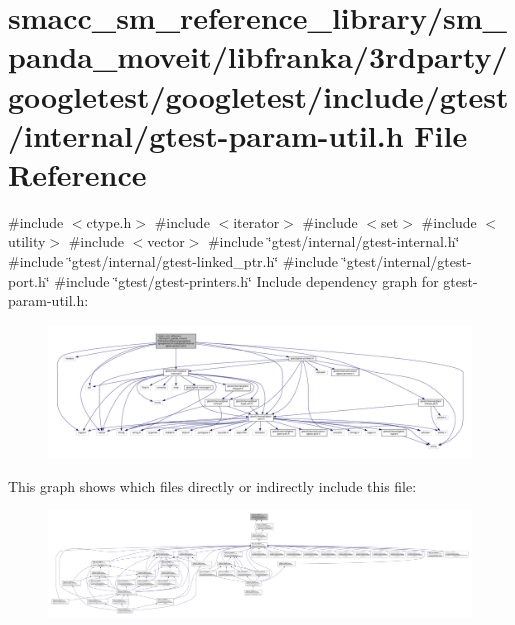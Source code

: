 \hypertarget{gtest-param-util_8h}{}\section{smacc\+\_\+sm\+\_\+reference\+\_\+library/sm\+\_\+panda\+\_\+moveit/libfranka/3rdparty/googletest/googletest/include/gtest/internal/gtest-\/param-\/util.h File Reference}
\label{gtest-param-util_8h}
{\ttfamily \#include $<$ctype.\+h$>$}\newline
{\ttfamily \#include $<$iterator$>$}\newline
{\ttfamily \#include $<$set$>$}\newline
{\ttfamily \#include $<$utility$>$}\newline
{\ttfamily \#include $<$vector$>$}\newline
{\ttfamily \#include \char`\"{}gtest/internal/gtest-\/internal.\+h\char`\"{}}\newline
{\ttfamily \#include \char`\"{}gtest/internal/gtest-\/linked\+\_\+ptr.\+h\char`\"{}}\newline
{\ttfamily \#include \char`\"{}gtest/internal/gtest-\/port.\+h\char`\"{}}\newline
{\ttfamily \#include \char`\"{}gtest/gtest-\/printers.\+h\char`\"{}}\newline
Include dependency graph for gtest-\/param-\/util.h\+:
\nopagebreak
\begin{figure}[H]
\begin{center}
\leavevmode
\includegraphics[width=350pt]{gtest-param-util_8h__incl}
\end{center}
\end{figure}
This graph shows which files directly or indirectly include this file\+:
\nopagebreak
\begin{figure}[H]
\begin{center}
\leavevmode
\includegraphics[width=350pt]{gtest-param-util_8h__dep__incl}
\end{center}
\end{figure}
